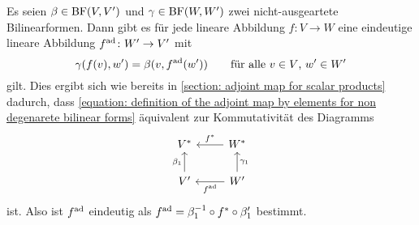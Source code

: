 Es seien $\beta \in \operatorname{BF}(V,V')$ und $\gamma \in \operatorname{BF}(W,W')$ zwei nicht-ausgeartete Bilinearformen.
Dann gibt es für jede lineare Abbildung $f \colon V \to W$ eine eindeutige lineare Abbildung $f^{\operatorname{ad}} \colon W' \to V'$ mit
\begin{equation}
  \label{equation: definition of the adjoint map by elements for non degenarete bilinear forms}
    \gamma(f(v), w')
  = \beta(v, f^{\operatorname{ad}}(w'))
  \qquad
  \text{für alle $v \in V$, $w' \in W'$}
\end{equation}
gilt.
Dies ergibt sich wie bereits in \ref{section: adjoint map for scalar products} dadurch, dass \eqref{equation: definition of the adjoint map by elements for non degenarete bilinear forms} äquivalent zur Kommutativität des Diagramms
\[
  \begin{tikzcd}
      \dual{V}
    & \dual{W}
      \arrow[swap]{l}{\dual{f}}
    \\
      V'
      \arrow{u}{\beta_1}
    & W'
      \arrow[swap]{u}{\gamma_1}
      \arrow{l}{\adj{f}}
  \end{tikzcd}
\]
ist.
Also ist $f^{\operatorname{ad}}$ eindeutig als $f^{\operatorname{ad}} = \beta_1^{-1} \circ f^* \circ \beta'_1$ bestimmt.













